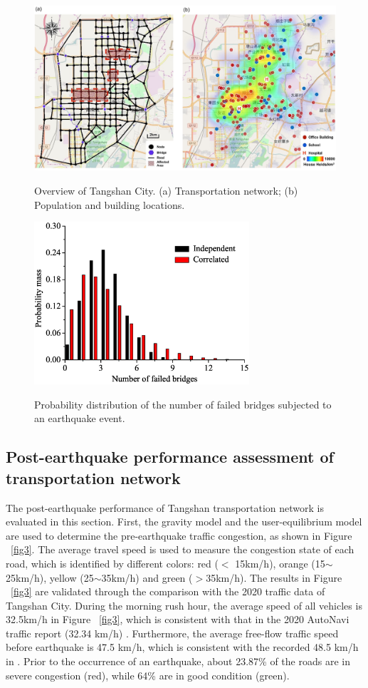 \documentclass[review,11pt,nonatbib]{elsarticle}
\begin{document}
\begin{figure}[!htp]\center
\includegraphics[width=12cm]{fig1.pdf}\\
\caption{Overview of Tangshan City. (a) Transportation network; (b) Population and building locations.}\label{fig1}
\end{figure}

\begin{figure}[!htp]\center
\includegraphics[width=8cm]{fig2.eps}\\
\caption{Probability distribution of the number of failed bridges subjected to an earthquake event.}\label{fig2}
\end{figure}

\subsection{Post-earthquake performance assessment of transportation network}
The post-earthquake performance of Tangshan transportation network is evaluated in this section. First, the gravity model and the user-equilibrium model are used to determine the pre-earthquake traffic congestion, as shown in Figure ~\ref{fig3}. The average travel speed is used to measure the congestion state of each road, which is identified by different colors: red ($<$ 15km/h), orange (15$\sim$25km/h), yellow (25$\sim$35km/h) and green ($>$35km/h). The results in Figure ~\ref{fig3} are validated through the comparison with the 2020 traffic data of Tangshan City. During the morning rush hour, the average speed of all vehicles is 32.5km/h in Figure ~\ref{fig3}, which is consistent with that in the 2020 AutoNavi traffic report (32.34 km/h) \citep{autonavi2020}. Furthermore, the average free-flow traffic speed before earthquake is 47.5 km/h, which is consistent with the recorded 48.5 km/h in \citep{autonavi2020}. Prior to the occurrence of an earthquake, about 23.87\% of the roads are in severe congestion (red), while 64\% are in good condition (green).
\end{document}
